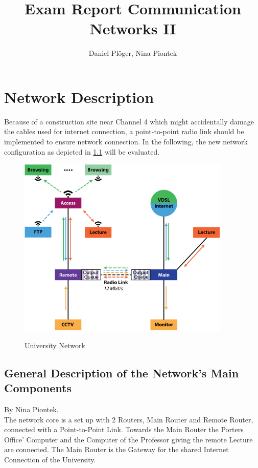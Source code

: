 \documentclass[a4paper,10pt]{book}\usepackage{graphicx}
\title{Exam Report Communication Networks II}
\author{Daniel Plöger, Nina Piontek}
\begin{document}
\maketitle
\tableofcontents



\chapter{Network Description}
Because of a construction site near Channel 4 which might accidentally damage the cables 
used for internet connection,
a point-to-point radio link should be implemented to ensure network connection.
In the following, the new network configuration as depicted in \ref{fig:network} will be evaluated.
\begin{figure}[!ht]
  \centering
    \includegraphics[width=0.9\textwidth]{graphics-03.eps}
    \label{fig:network}
    \caption{University Network}
\end{figure}

\section{General Description of the Network's Main Components}
By Nina Piontek.\\

The network core is a set up with 2 Routers, Main Router and Remote Router, connected with a Point-to-Point Link. 
Towards the Main Router the Porters Office' Computer and the Computer of the Professor giving the remote Lecture are connected.
The Main Router is the Gateway for the shared Internet Connection of the University.
\end{document}
